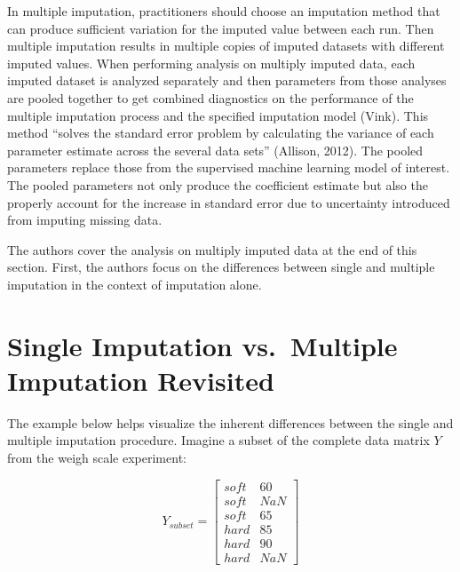 \documentclass[12pt,oneside]{chicagocapstone}
\begin{document}
In multiple imputation, practitioners should choose an imputation method
that can produce sufficient variation for the imputed value between each
run. Then multiple imputation results in multiple copies of imputed
datasets with different imputed values. When performing analysis on
multiply imputed data, each imputed dataset is analyzed separately and
then parameters from those analyses are pooled together to get combined
diagnostics on the performance of the multiple imputation process and
the specified imputation model (Vink). This method ``solves the standard
error problem by calculating the variance of each parameter estimate
across the several data sets'' (Allison, 2012). The pooled parameters
replace those from the supervised machine learning model of interest.
The pooled parameters not only produce the coefficient estimate but also
the properly account for the increase in standard error due to
uncertainty introduced from imputing missing data.

The authors cover the analysis on multiply imputed data at the end of
this section. First, the authors focus on the differences between single
and multiple imputation in the context of imputation alone.

\section*{Single Imputation vs.~Multiple Imputation
Revisited}\label{background-example}

The example below helps visualize the inherent differences between the
single and multiple imputation procedure. Imagine a subset of the
complete data matrix \(Y\) from the weigh scale experiment:

\[Y_{subset}=\begin{bmatrix}soft & 60 \\ soft & NaN \\ soft & 65 \\ hard & 85 \\ hard & 90 \\ hard & NaN \end{bmatrix}\]
\end{document}
